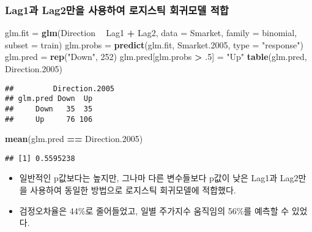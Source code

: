 \documentclass[]{article}
\newenvironment{Shaded}{\begin{snugshade}}{\end{snugshade}}
\newcommand{\KeywordTok}[1]{\textcolor[rgb]{0.13,0.29,0.53}{\textbf{#1}}}
\newcommand{\DataTypeTok}[1]{\textcolor[rgb]{0.13,0.29,0.53}{#1}}
\newcommand{\DecValTok}[1]{\textcolor[rgb]{0.00,0.00,0.81}{#1}}
\newcommand{\StringTok}[1]{\textcolor[rgb]{0.31,0.60,0.02}{#1}}
\newcommand{\OperatorTok}[1]{\textcolor[rgb]{0.81,0.36,0.00}{\textbf{#1}}}
\newcommand{\NormalTok}[1]{#1}
\providecommand{\tightlist}{%
  \setlength{\itemsep}{0pt}\setlength{\parskip}{0pt}}
\begin{document}
\subsubsection{Lag1과 Lag2만을 사용하여 로지스틱 회귀모델
적합}\label{lag1-lag2----}

\begin{Shaded}
\begin{Highlighting}[]
\NormalTok{glm.fit =}\StringTok{ }\KeywordTok{glm}\NormalTok{(Direction }\OperatorTok{~}\StringTok{ }\NormalTok{Lag1 }\OperatorTok{+}\StringTok{ }\NormalTok{Lag2, }
              \DataTypeTok{data =}\NormalTok{ Smarket,}
              \DataTypeTok{family =}\NormalTok{ binomial,}
              \DataTypeTok{subset =}\NormalTok{ train)}
\NormalTok{glm.probs =}\StringTok{ }\KeywordTok{predict}\NormalTok{(glm.fit, Smarket.}\DecValTok{2005}\NormalTok{, }\DataTypeTok{type =} \StringTok{"response"}\NormalTok{)}
\NormalTok{glm.pred =}\StringTok{ }\KeywordTok{rep}\NormalTok{(}\StringTok{"Down"}\NormalTok{, }\DecValTok{252}\NormalTok{)}
\NormalTok{glm.pred[glm.probs }\OperatorTok{>}\StringTok{ }\NormalTok{.}\DecValTok{5}\NormalTok{] =}\StringTok{ "Up"}
\KeywordTok{table}\NormalTok{(glm.pred, Direction.}\DecValTok{2005}\NormalTok{)}
\end{Highlighting}
\end{Shaded}

\begin{verbatim}
##         Direction.2005
## glm.pred Down  Up
##     Down   35  35
##     Up     76 106
\end{verbatim}

\begin{Shaded}
\begin{Highlighting}[]
\KeywordTok{mean}\NormalTok{(glm.pred }\OperatorTok{==}\StringTok{ }\NormalTok{Direction.}\DecValTok{2005}\NormalTok{)}
\end{Highlighting}
\end{Shaded}

\begin{verbatim}
## [1] 0.5595238
\end{verbatim}

\begin{itemize}
\tightlist
\item
  일반적인 p값보다는 높지만, 그나마 다른 변수들보다 p값이 낮은 Lag1과
  Lag2만을 사용하여 동일한 방법으로 로지스틱 회귀모델에 적합했다.
\item
  검정오차율은 44\%로 줄어들었고, 일별 주가지수 움직임의 56\%를 예측할
  수 있었다.
\end{itemize}
\end{document}

